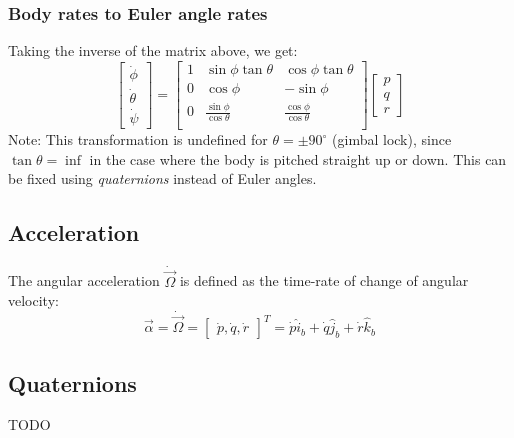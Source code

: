 \subsubsection{Body rates to Euler angle rates}

Taking the inverse of the matrix above, we get:
\begin{equation} \nonumber
    \begin{bmatrix}
        \dot{\phi}   \\
        \dot{\theta} \\
        \dot{\psi}
    \end{bmatrix} =
    \begin{bmatrix}
        1 & \sin\phi\tan\theta          & \cos\phi\tan\theta          \\
        0 & \cos\phi                    & -\sin\phi                   \\
        0 & \frac{\sin\phi}{\cos\theta} & \frac{\cos\phi}{\cos\theta} \\
    \end{bmatrix}
    \begin{bmatrix}
        p \\ q \\ r
    \end{bmatrix}
\end{equation}
Note: This transformation is undefined for \( \theta = \pm 90^\circ \) (gimbal lock), since \(\tan\theta=\inf\) in the case where the body is pitched straight up or down. This can be fixed using \textit{quaternions} instead of Euler angles.

\subsection{Acceleration}
The angular acceleration \( \dot{\vec{\Omega}} \) is defined as the time-rate of change of angular velocity:
\begin{equation} \nonumber
    \vec{\alpha} = \dot{\vec{\Omega}} = \begin{bmatrix}
        \dot{p}, \dot{q}, \dot{r}
    \end{bmatrix}^T = \dot{p} \hat{i}_b + \dot{q} \hat{j}_b + \dot{r} \hat{k}_b
\end{equation}

\subsection{Quaternions}
TODO

